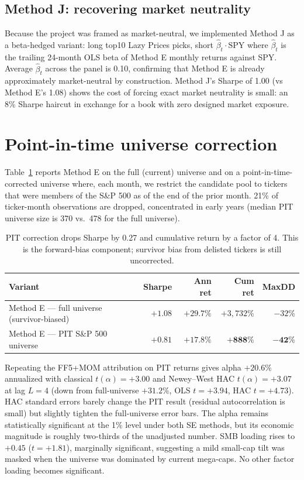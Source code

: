 \documentclass[11pt]{article}
\begin{document}
\subsection{Method J: recovering market neutrality}
\label{sec:methodJ}

Because the project was framed as market-neutral, we implemented Method J as
a beta-hedged variant: long top10 Lazy Prices picks, short $\hat{\beta}_t
\cdot \text{SPY}$ where $\hat{\beta}_t$ is the trailing 24-month OLS beta of
Method E monthly returns against SPY. Average $\hat{\beta}_t$ across the
panel is 0.10, confirming that Method E is already approximately
market-neutral by construction. Method J's Sharpe of 1.00 (vs Method E's
1.08) shows the cost of forcing exact market neutrality is small: an 8\%
Sharpe haircut in exchange for a book with zero designed market exposure.

\section{Point-in-time universe correction}
\label{sec:pit}

Table~\ref{tab:pit} reports Method E on the full (current) universe and on a
point-in-time-corrected universe where, each month, we restrict the
candidate pool to tickers that were members of the S\&P 500 as of the end of
the prior month. 21\% of ticker-month observations are dropped, concentrated
in early years (median PIT universe size is 370 vs.\ 478 for the full
universe).

\begin{table}[h]
\centering
\begin{tabular}{lrrrr}
\toprule
Variant & Sharpe & Ann ret & Cum ret & MaxDD \\
\midrule
Method E — full universe (survivor-biased) & $+1.08$ & $+29.7\%$ & $+3{,}732\%$ & $-32\%$ \\
Method E — PIT S\&P 500 universe            & $\mathbf{+0.81}$ & $\mathbf{+17.8\%}$ & $\mathbf{+888\%}$ & $\mathbf{-42\%}$ \\
\bottomrule
\end{tabular}
\caption{PIT correction drops Sharpe by 0.27 and cumulative return by a
  factor of 4. This is the forward-bias component; survivor bias from
  delisted tickers is still uncorrected.}
\label{tab:pit}
\end{table}

Repeating the FF5+MOM attribution on PIT returns gives alpha $+20.6\%$
annualized with classical $t(\alpha) = +3.00$ and Newey--West HAC
$t(\alpha) = +3.07$ at lag $L=4$ (down from full-universe $+31.2\%$, OLS
$t = +3.94$, HAC $t = +4.73$). HAC standard errors barely change the PIT
result (residual autocorrelation is small) but slightly tighten the
full-universe error bars. The alpha remains statistically significant at the
1\% level under both SE methods, but its economic magnitude is roughly
two-thirds of the unadjusted number. SMB loading rises to $+0.45$
($t = +1.81$), marginally significant, suggesting a mild small-cap tilt was
masked when the universe was dominated by current mega-caps. No other factor
loading becomes significant.
\end{document}
